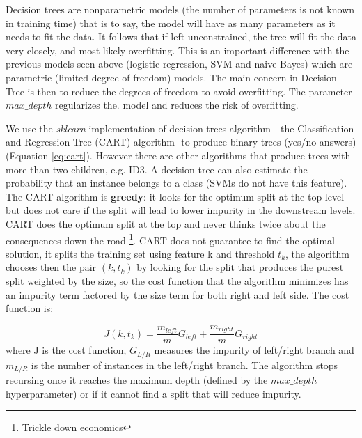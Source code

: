 \documentclass[11pt]{article}
\theoremstyle{definition}
\theoremstyle{remark}
\begin{document}
Decision trees are nonparametric models (the number of parameters is not known in training time) that is to say, the model will have as many parameters as it needs to fit the data. It follows that if left unconstrained, the tree will fit the data very closely, and most likely overfitting. This is an important difference with the previous models seen above (logistic regression, SVM and naive Bayes) which are parametric (limited degree of freedom) models. 
The main concern in Decision Tree is then to reduce the degrees of freedom to avoid overfitting. The parameter $max\_depth$ regularizes the. model and reduces the risk of overfitting.

We use the \emph{sklearn} implementation of decision trees algorithm - the Classification and Regression Tree (CART) algorithm- to produce binary trees (yes/no answers) (Equation \ref{eq:cart}). However there are other algorithms that produce trees with more than two children, e.g. ID3. A decision tree can also estimate the probability that an instance belongs to a class (SVMs do not have this feature).
The CART algorithm is \textbf{greedy}: it looks for the optimum split at the top level but does not care if the split will lead to lower impurity in the downstream levels. CART does the optimum split at the top and never thinks twice about the consequences down the road \footnote{Trickle down economics}. 
CART does not guarantee to find the optimal solution, it splits the training set using feature k and threshold $t_k$, the algorithm chooses then the pair $(k,t_k)$ by looking for the split that produces the purest split weighted by the size, so the cost function that the algorithm minimizes has an impurity term factored by the size term for both right and left side. The cost function is: 

\begin{equation}\label{eq:cart}
J(k,t_k) = \frac{m_{left}}{m}G_{left} + \frac{m_{right}}{m}G_{right}
\end{equation}
where J is the cost function, $G_{L/R}$ measures the impurity of left/right branch and $m_{L/R}$ is the number of instances in the left/right branch.  
The algorithm stops recursing once it reaches the maximum depth (defined by the $max\_depth$ hyperparameter) or if it cannot find a split that will reduce impurity. 
\end{document}
